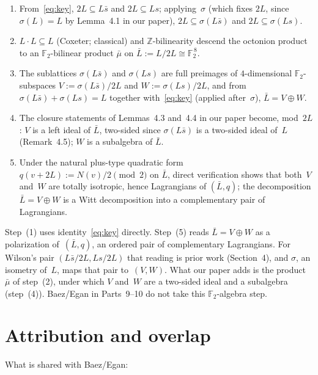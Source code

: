 \documentclass[11pt]{amsart}
\newcommand{\ZZ}{\mathbb{Z}}
\newcommand{\FF}{\mathbb{F}}
\newcommand{\Nrm}{N}
\begin{document}
\begin{enumerate}
\item From~\eqref{eq:key}, $2 L \subseteq L\bar s$ and $2 L \subseteq Ls$;
  applying~$\sigma$ (which fixes $2 L$, since $\sigma(L) = L$ by
  Lemma~4.1 in our paper),
  $2 L \subseteq \sigma(L\bar s)$ and $2 L \subseteq \sigma(Ls)$.
\item $L \cdot L \subseteq L$ (Coxeter; classical) and
  $\ZZ$-bilinearity descend the octonion product to an
  $\FF_2$-bilinear product $\bar\mu$ on
  $\bar L := L / 2 L \cong \FF_2^{\,8}$.
\item The sublattices $\sigma(L\bar s)$ and $\sigma(Ls)$ are full
  preimages of $4$-dimensional $\FF_2$-subspaces
  \(V := \sigma(L\bar s) / 2 L\) and \(W := \sigma(Ls) / 2 L\),
  and from $\sigma(L\bar s) + \sigma(Ls) = L$ together
  with~\eqref{eq:key} (applied after~$\sigma$),
  $\bar L = V \oplus W$.
\item The closure statements of Lemmas~4.3 and~4.4 in our paper
  become, mod~$2L$:
  \(V\) is a left ideal of $\bar L$, two-sided since
  $\sigma(L\bar s)$ is a two-sided ideal of~$L$ (Remark~4.5);
  \(W\) is a subalgebra of $\bar L$.
\item Under the natural plus-type quadratic form $q(v + 2L) :=
  \Nrm(v) / 2 \pmod 2$ on $\bar L$, direct verification shows that
  both~$V$ and~$W$ are totally isotropic, hence Lagrangians of
  $(\bar L, q)$; the decomposition $\bar L = V \oplus W$ is a
  Witt decomposition into a complementary pair of Lagrangians.
\end{enumerate}

Step~(1) uses identity~\eqref{eq:key} directly.  Step~(5) reads
$\bar L = V \oplus W$ as a polarization of~$(\bar L, q)$, an ordered
pair of complementary Lagrangians.  For Wilson's pair
$(L\bar s/2L, Ls/2L)$ that reading is prior work (Section~4), and
$\sigma$, an isometry of~$L$, maps that pair to~$(V, W)$.  What our
paper adds is the product~$\bar\mu$ of step~(2), under which $V$
and~$W$ are a two-sided ideal and a subalgebra (step~(4)).
Baez/Egan in Parts~9--10 do not take this $\FF_2$-algebra step.

\section{Attribution and overlap}

What is shared with Baez/Egan:
\end{document}

